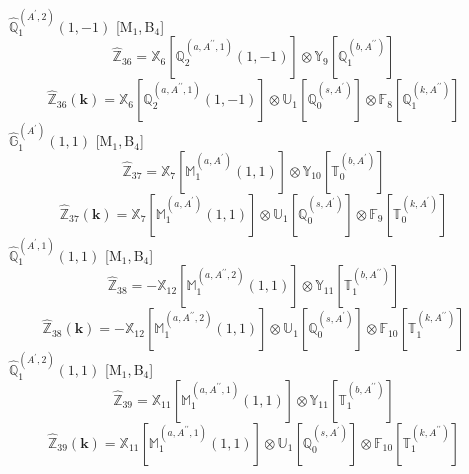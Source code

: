 \documentclass[fleqn,10pt,landscape]{article}
\begin{document}
\begin{itemize}
\noindent {} $\,\,\,\hat{\mathbb{Q}}_{1}^{(A^{\prime},2)}(1,-1)$ [M$_{1}$,\,B$_{4}$]
\begin{dmath*}
\hat{\mathbb{Z}}_{36}=\mathbb{X}_{6}[\mathbb{Q}_{2}^{(a,A^{\prime\prime},1)}(1,-1)] \otimes\mathbb{Y}_{9}[\mathbb{Q}_{1}^{(b,A^{\prime\prime})}]
\end{dmath*}
\begin{dmath*}
\hat{\mathbb{Z}}_{36}(\bm{k})=\mathbb{X}_{6}[\mathbb{Q}_{2}^{(a,A^{\prime\prime},1)}(1,-1)] \otimes\mathbb{U}_{1}[\mathbb{Q}_{0}^{(s,A^{\prime})}] \otimes\mathbb{F}_{8}[\mathbb{Q}_{1}^{(k,A^{\prime\prime})}]
\end{dmath*}
\vspace{4mm}
\noindent {} $\,\,\,\hat{\mathbb{G}}_{1}^{(A^{\prime})}(1,1)$ [M$_{1}$,\,B$_{4}$]
\begin{dmath*}
\hat{\mathbb{Z}}_{37}=\mathbb{X}_{7}[\mathbb{M}_{1}^{(a,A^{\prime})}(1,1)] \otimes\mathbb{Y}_{10}[\mathbb{T}_{0}^{(b,A^{\prime})}]
\end{dmath*}
\begin{dmath*}
\hat{\mathbb{Z}}_{37}(\bm{k})=\mathbb{X}_{7}[\mathbb{M}_{1}^{(a,A^{\prime})}(1,1)] \otimes\mathbb{U}_{1}[\mathbb{Q}_{0}^{(s,A^{\prime})}] \otimes\mathbb{F}_{9}[\mathbb{T}_{0}^{(k,A^{\prime})}]
\end{dmath*}
\vspace{4mm}
\noindent {} $\,\,\,\hat{\mathbb{Q}}_{1}^{(A^{\prime},1)}(1,1)$ [M$_{1}$,\,B$_{4}$]
\begin{dmath*}
\hat{\mathbb{Z}}_{38}=- \mathbb{X}_{12}[\mathbb{M}_{1}^{(a,A^{\prime\prime},2)}(1,1)] \otimes\mathbb{Y}_{11}[\mathbb{T}_{1}^{(b,A^{\prime\prime})}]
\end{dmath*}
\begin{dmath*}
\hat{\mathbb{Z}}_{38}(\bm{k})=- \mathbb{X}_{12}[\mathbb{M}_{1}^{(a,A^{\prime\prime},2)}(1,1)] \otimes\mathbb{U}_{1}[\mathbb{Q}_{0}^{(s,A^{\prime})}] \otimes\mathbb{F}_{10}[\mathbb{T}_{1}^{(k,A^{\prime\prime})}]
\end{dmath*}
\vspace{4mm}
\noindent {} $\,\,\,\hat{\mathbb{Q}}_{1}^{(A^{\prime},2)}(1,1)$ [M$_{1}$,\,B$_{4}$]
\begin{dmath*}
\hat{\mathbb{Z}}_{39}=\mathbb{X}_{11}[\mathbb{M}_{1}^{(a,A^{\prime\prime},1)}(1,1)] \otimes\mathbb{Y}_{11}[\mathbb{T}_{1}^{(b,A^{\prime\prime})}]
\end{dmath*}
\begin{dmath*}
\hat{\mathbb{Z}}_{39}(\bm{k})=\mathbb{X}_{11}[\mathbb{M}_{1}^{(a,A^{\prime\prime},1)}(1,1)] \otimes\mathbb{U}_{1}[\mathbb{Q}_{0}^{(s,A^{\prime})}] \otimes\mathbb{F}_{10}[\mathbb{T}_{1}^{(k,A^{\prime\prime})}]

\end{dmath*}
\end{itemize}
\end{document}
